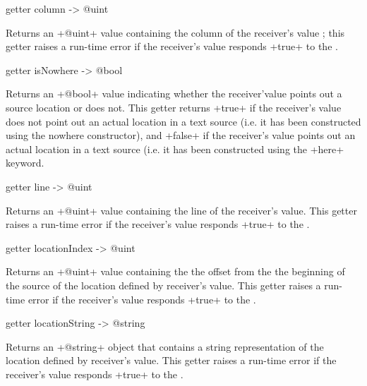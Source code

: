 
\begin{galgascode}
getter column -> @uint
\end{galgascode}

Returns an \ggs+@uint+ value containing the column of the receiver's value ; this getter raises a run-time error if the receiver's value responds \ggs+true+ to the .



\begin{galgascode}
getter isNowhere -> @bool
\end{galgascode}

Returns an \ggs+@bool+ value indicating whether the receiver'value points out a source location or does not. This getter returns \ggs+true+ if the receiver's value does not point out an actual location in a text source (i.e. it has been constructed using the nowhere constructor), and \ggs+false+ if the receiver's value points out an actual location in a text source (i.e. it has been constructed using the \ggs+here+ keyword.



\begin{galgascode}
getter line -> @uint
\end{galgascode}

Returns an \ggs+@uint+ value containing the line of the receiver's value. This getter raises a run-time error if the receiver's value responds \ggs+true+ to the .



\begin{galgascode}
getter locationIndex -> @uint
\end{galgascode}

Returns an \ggs+@uint+ value containing the the offset from the the beginning of the source of the location defined by receiver's value. This getter raises a run-time error if the receiver's value responds \ggs+true+ to the .



\begin{galgascode}
getter locationString -> @string
\end{galgascode}

Returns an \ggs+@string+ object that contains a string representation of the location defined by receiver's value. This getter raises a run-time error if the receiver's value responds \ggs+true+ to the .

